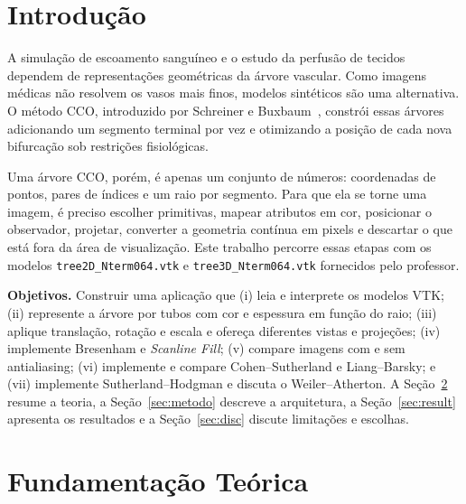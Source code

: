 \documentclass[11pt, a4paper]{article}
\begin{document}
\vspace{0.4cm}

\section{Introdução}
A simulação de escoamento sanguíneo e o estudo da perfusão de tecidos dependem de representações geométricas da árvore vascular. Como imagens médicas não resolvem os vasos mais finos, modelos sintéticos são uma alternativa. O método CCO, introduzido por Schreiner e Buxbaum~\cite{schreiner1993}, constrói essas árvores adicionando um segmento terminal por vez e otimizando a posição de cada nova bifurcação sob restrições fisiológicas.

Uma árvore CCO, porém, é apenas um conjunto de números: coordenadas de pontos, pares de índices e um raio por segmento. Para que ela se torne uma imagem, é preciso escolher primitivas, mapear atributos em cor, posicionar o observador, projetar, converter a geometria contínua em pixels e descartar o que está fora da área de visualização. Este trabalho percorre essas etapas com os modelos \texttt{tree2D\_Nterm064.vtk} e \texttt{tree3D\_Nterm064.vtk} fornecidos pelo professor.

\textbf{Objetivos.} Construir uma aplicação que (i) leia e interprete os modelos VTK; (ii) represente a árvore por tubos com cor e espessura em função do raio; (iii) aplique translação, rotação e escala e ofereça diferentes vistas e projeções; (iv) implemente Bresenham e \emph{Scanline Fill}; (v) compare imagens com e sem antialiasing; (vi) implemente e compare Cohen--Sutherland e Liang--Barsky; e (vii) implemente Sutherland--Hodgman e discuta o Weiler--Atherton. A Seção~\ref{sec:fund} resume a teoria, a Seção~\ref{sec:metodo} descreve a arquitetura, a Seção~\ref{sec:result} apresenta os resultados e a Seção~\ref{sec:disc} discute limitações e escolhas.

\section{Fundamentação Teórica}\label{sec:fund}
\end{document}
